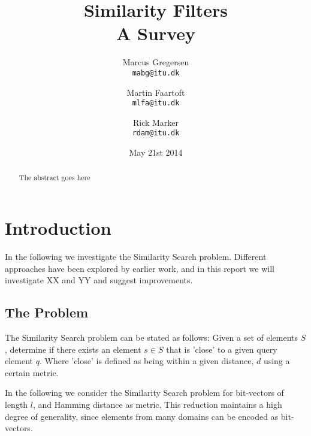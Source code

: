 \documentclass[a4paper,11pt]{article}
\begin{document}
\date{May 21st 2014}
\title{Similarity Filters\\A Survey}

\author{Marcus Gregersen\\
\texttt{mabg@itu.dk}
\and Martin Faartoft\\
\texttt{mlfa@itu.dk}
\and Rick Marker\\
\texttt{rdam@itu.dk}}
\clearpage\maketitle
\thispagestyle{empty}
\setcounter{page}{1}
\begin{abstract}
The abstract goes here
\end{abstract}

\newpage

\section{Introduction}
In the following we investigate the Similarity Search problem. Different approaches have been explored by earlier work, and in this report we will investigate XX and YY  and suggest improvements.

\subsection{The Problem}
The Similarity Search problem can be stated as follows: Given a set of elements $S$, determine if there exists an element $s \in S$ that is 'close' to a given query element $q$. Where 'close' is defined as being within a given distance, $d$ using a certain metric.

In the following we consider the Similarity Search problem for bit-vectors of length $l$, and Hamming distance as metric. This reduction maintains a high degree of generality, since elements from many domains can be encoded as bit-vectors.
\end{document}
